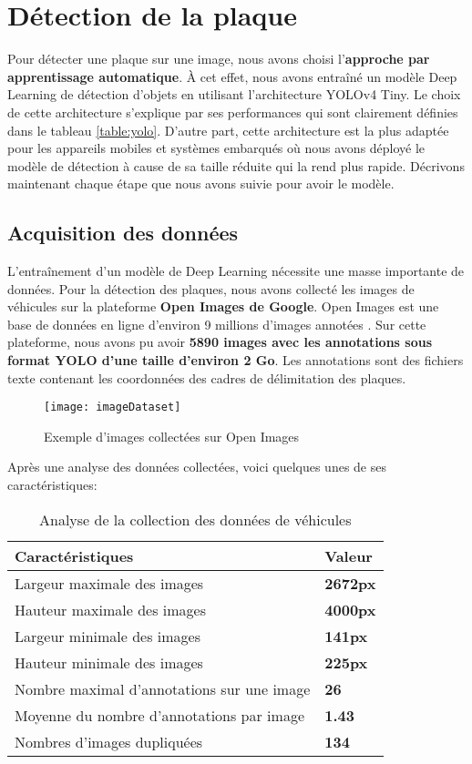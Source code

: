 \section{Détection de la plaque}
Pour détecter une plaque sur une image, nous avons choisi l’\textbf{approche par apprentissage automatique}. À cet effet, nous avons entraîné un modèle Deep Learning de détection d’objets en utilisant l’architecture YOLOv4 Tiny. Le choix de cette architecture s’explique par ses performances qui sont clairement définies dans le tableau \ref{table:yolo}. D’autre part, cette architecture est la plus adaptée pour les appareils mobiles et systèmes embarqués où nous avons déployé le modèle de détection à cause de sa taille réduite qui la rend plus rapide. Décrivons maintenant chaque étape que nous avons suivie pour avoir le modèle.
    \subsection{Acquisition des données}
    L’entraînement d’un modèle de Deep Learning nécessite une masse importante de données. Pour la détection des plaques, nous avons collecté les images de véhicules sur la plateforme \textbf{Open Images de Google}. Open Images est une base de données en ligne d'environ 9 millions d'images annotées \cite{oid6}. Sur cette plateforme, nous avons pu  avoir \textbf{5890 images avec les annotations sous format YOLO d’une taille d’environ 2 Go}. Les annotations sont des fichiers texte contenant les coordonnées des cadres de délimitation des plaques. 
    \begin{figure}[H]
        \centering
        \texttt{[image: imageDataset]}
        \caption{Exemple d'images collectées sur Open Images}
    \end{figure}
    Après une analyse des données collectées, voici quelques unes de ses caractéristiques:
    \begin{table}[H]
        \centering
        \begin{tabular}{|l|l|}
            \hline
            \rowcolor{Gray}
            \textbf{Caractéristiques} & \textbf{Valeur} \\ \hline
            Largeur maximale des images & \textbf{2672px} \\ \hline
            Hauteur maximale des images & \textbf{4000px} \\ \hline
            Largeur minimale des images & \textbf{141px} \\ \hline
            Hauteur minimale des images & \textbf{225px} \\ \hline
            Nombre maximal d'annotations sur une image & \textbf{26} \\ \hline
            Moyenne du nombre d'annotations par image & \textbf{1.43} \\ \hline
            Nombres d'images dupliquées & \textbf{134} \\ \hline
        \end{tabular}
        \caption{Analyse de la collection des données de véhicules}
    \end{table}
